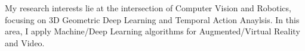 


\begin{cventries}

\cvtext
{ %
\begin{cvitems}
My research interests lie at the intersection of Computer Vision and Robotics, focusing on 3D Geometric Deep Learning and Temporal Action Anaylsis.
In this area, I apply Machine/Deep Learning algorithms for Augmented/Virtual Reality and Video.
\end{cvitems}
}


\end{cventries}
